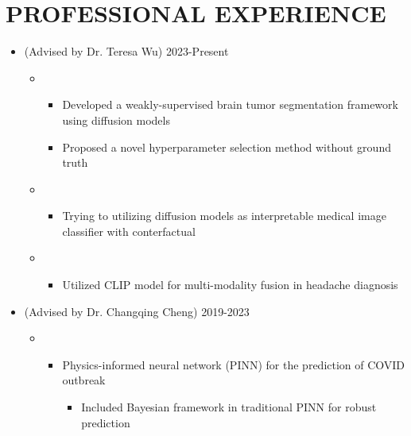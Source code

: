 \documentclass[10pt]{article}
\begin{document}
\section*{PROFESSIONAL EXPERIENCE}
\begin{itemize}
	\item {} (Advised by Dr. Teresa Wu)
        \hfill{2023-Present}
        \begin{itemize}[label=$\bullet$]
            \item {}
            \begin{itemize}[label=$-$]
	            \item Developed a weakly-supervised brain tumor segmentation framework using diffusion models
	            \item Proposed a novel hyperparameter selection method without ground truth
	        \end{itemize}
            \item {}
            \begin{itemize}[label=$-$]
				\item Trying to utilizing diffusion models as interpretable medical image classifier with conterfactual 
			\end{itemize}
            \item {}
            \begin{itemize}[label=$-$]
				\item Utilized CLIP model for multi-modality fusion in headache diagnosis
			\end{itemize}
        \end{itemize}
        
        
	\item {} (Advised by Dr. Changqing Cheng)
	\hfill{2019-2023}
	\begin{itemize}[label=$\bullet$]
	
	    \item {}
		\begin{itemize}[label=$\bullet$]
		    \item Physics-informed neural network (PINN) for the prediction of COVID outbreak 
		    \begin{itemize}[label=$-$]
	            \item Included Bayesian framework in traditional PINN for robust prediction
	        \end{itemize}
		\end{itemize}
		

\end{itemize}
\end{itemize}
\end{document}
